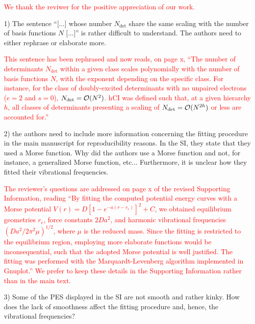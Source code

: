 \documentclass[10pt]{letter}
\newcommand{\alert}[1]{\textcolor{red}{#1}}
\newcommand{\Ndet}{N_\text{det}}
\begin{document}
\begin{letter}
\alert{
We thank the reviwer for the positive appreciation of our work.
}

{1) The sentence ``[...] whose number $\Ndet$ share the same scaling with the number of basis functions $N$ [...]'' is rather difficult to understand. The authors need to either rephrase or elaborate more.
}

\alert{
This sentence has been rephrased and now reads, on page x,
``The number of determinants $\Ndet$ within a given class scales polynomially with the number of basis functions $N$, with the exponent depending on the specific class.
For instance, for the class of doubly-excited determinants with no unpaired electrons ($e=2$ and $s=0$), $\Ndet = \order*{N^2}$.
hCI was defined such that, at a given hierarchy $h$, all classes of determinants presenting a scaling of $\Ndet = \order*{N^{2h}}$ or less are accounted for.''
}

{2) the authors need to include more information concerning the fitting procedure in the main manuscript for reproducibility reasons. In the SI, they state that they used a Morse function. Why did the authors use a Morse function and not, for instance, a generalized Morse function, etc... Furthermore, it is unclear how they fitted their vibrational frequencies.
}

\alert{
The reviewer's questions are addressed on page x of the revised Supporting Information, reading
``By fitting the computed potential energy curves with a Morse potential $V(r) = D [1 - e^{-a(r-r_e)}]^2 + C $,
we obtained equilibrium geometries $r_e$, force constants $2Da^2$, and harmonic vibrational frequencies $\left( Da^2/2\pi^2\mu \right)^{1/2}$,
where $\mu$ is the reduced mass.
Since the fitting is restricted to the equilibrium region, employing more elaborate functions would be inconsequential, such that the adopted Morse potential is well justified.
The fitting was performed with the Marquardt-Levenberg algorithm implemented in Gnuplot.''
We prefer to keep these details in the Supporting Information rather than in the main text.
}

{3) Some of the PES displayed in the SI are not smooth and rather kinky. How does the lack of smoothness affect the fitting procedure and, hence, the vibrational frequencies?
}


\end{letter}
\end{document}
